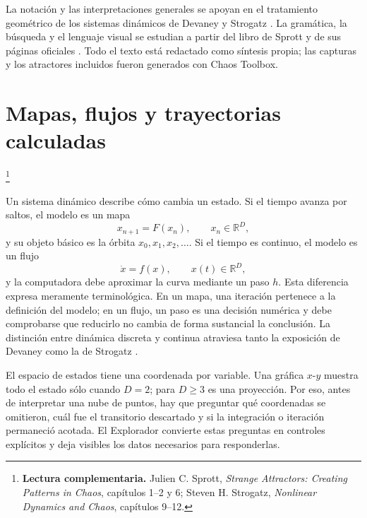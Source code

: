 \documentclass[11pt]{article}
\newcommand{\R}{\mathbb{R}}
\newcommand{\lecturasprott}[1]{%
  \par\noindent{\sffamily\scriptsize\color{Teal}Lectura complementaria}\footnote{%
  \textbf{Lectura complementaria.} #1}\par}
\begin{document}
La notación y las interpretaciones generales se apoyan en el tratamiento geométrico de
los sistemas dinámicos de Devaney y Strogatz \cite{devaney2022,strogatz2018}. La gramática,
la búsqueda y el lenguaje visual se estudian a partir del libro de Sprott y de sus
páginas oficiales \cite{sprott1993,sprottbookonline}. Todo el texto está redactado como
síntesis propia; las capturas y los atractores incluidos fueron generados con Chaos
Toolbox.

\section{Mapas, flujos y trayectorias calculadas}
\lecturasprott{Julien C. Sprott, \emph{Strange Attractors: Creating Patterns in Chaos}, capítulos 1--2 y 6; Steven H. Strogatz, \emph{Nonlinear Dynamics and Chaos}, capítulos 9--12.}

Un sistema dinámico describe cómo cambia un estado. Si el tiempo avanza por saltos,
el modelo es un mapa
\[
  x_{n+1}=F(x_n), \qquad x_n\in\R^D,
\]
y su objeto básico es la órbita
\(x_0,x_1,x_2,\ldots\). Si el tiempo es continuo, el modelo es un flujo
\[
  \dot{x}=f(x), \qquad x(t)\in\R^D,
\]
y la computadora debe aproximar la curva mediante un paso \(h\). Esta diferencia expresa
meramente terminológica. En un mapa, una iteración pertenece a la definición del
modelo; en un flujo, un paso es una decisión numérica y debe comprobarse que reducirlo
no cambia de forma sustancial la conclusión. La distinción entre dinámica discreta y
continua atraviesa tanto la exposición de Devaney como la de Strogatz
\cite{devaney2022,strogatz2018}.

El espacio de estados tiene una coordenada por variable. Una gráfica \(x\)-\(y\) muestra
todo el estado sólo cuando \(D=2\); para \(D\geq 3\) es una proyección. Por eso, antes de
interpretar una nube de puntos, hay que preguntar qué coordenadas se omitieron, cuál
fue el transitorio descartado y si la integración o iteración permaneció acotada. El
Explorador convierte estas preguntas en controles explícitos y deja visibles los datos necesarios para responderlas.
\end{document}
